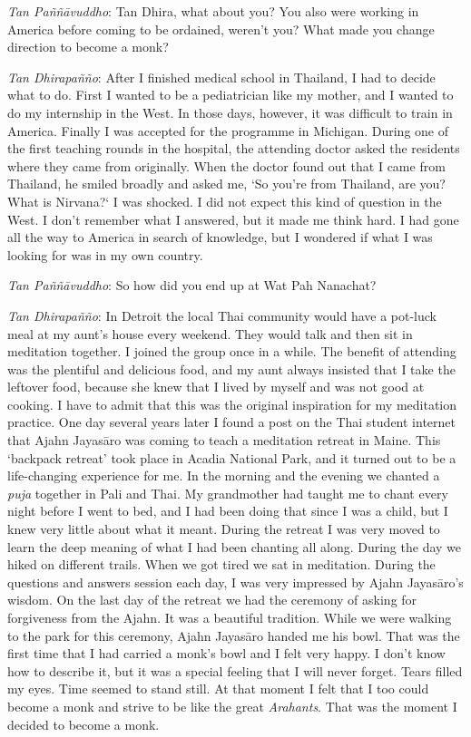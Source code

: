 \emph{Tan Paññāvuddho}‎: Tan Dhira, what about you? You also were
working in America before coming to be ordained, weren't you? What made
you change direction to become a monk?

\emph{Tan Dhirapañño}‎: After I finished medical school in Thailand, I
had to decide what to do. First I wanted to be a pediatrician like my
mother, and I wanted to do my internship in the West. In those days,
however, it was difficult to train in America. Finally I was accepted
for the programme in Michigan. During one of the first teaching rounds
in the hospital, the attending doctor asked the residents where they
came from originally. When the doctor found out that I came from
Thailand, he smiled broadly and asked me, `So you're from Thailand, are
you? What is Nirvana?` I was shocked. I did not expect this kind of
question in the West. I don't remember what I answered, but it made me
think hard. I had gone all the way to America in search of knowledge,
but I wondered if what I was looking for was in my own country.

\emph{Tan Paññāvuddho}‎: So how did you end up at Wat Pah Nanachat?

\emph{Tan Dhirapañño}‎: In Detroit the local Thai community would have a
pot-luck meal at my aunt's house every weekend. They would talk and then
sit in meditation together. I joined the group once in a while. The
benefit of attending was the plentiful and delicious food, and my aunt
always insisted that I take the leftover food, because she knew that I
lived by myself and was not good at cooking. I have to admit that this
was the original inspiration for my meditation practice. One day several
years later I found a post on the Thai student internet that Ajahn
Jayasāro was coming to teach a meditation retreat in Maine. This
`backpack retreat' took place in Acadia National Park, and it turned out
to be a life-changing experience for me. In the morning and the evening
we chanted a \emph{puja} together in Pali and Thai. My grandmother had
taught me to chant every night before I went to bed, and I had been
doing that since I was a child, but I knew very little about what it
meant. During the retreat I was very moved to learn the deep meaning of
what I had been chanting all along. During the day we hiked on different
trails. When we got tired we sat in meditation. During the questions and
answers session each day, I was very impressed by Ajahn Jayasāro's
wisdom. On the last day of the retreat we had the ceremony of asking for
forgiveness from the Ajahn. It was a beautiful tradition. While we were
walking to the park for this ceremony, Ajahn Jayasāro handed me his
bowl. That was the first time that I had carried a monk's bowl and I
felt very happy. I don't know how to describe it, but it was a special
feeling that I will never forget. Tears filled my eyes. Time seemed to
stand still. At that moment I felt that I too could become a monk and
strive to be like the great \emph{Arahants}. That was the moment I
decided to become a monk.

